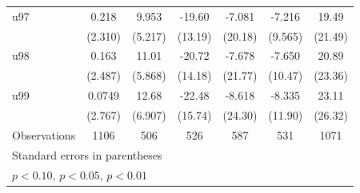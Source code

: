 \begin{table}[htbp]
\begin{tabular}{l*{6}{c}}
\addlinespace
u97                 &       0.218         &       9.953\sym{*}  &      -19.60         &      -7.081         &      -7.216         &       19.49         \\
                    &     (2.310)         &     (5.217)         &     (13.19)         &     (20.18)         &     (9.565)         &     (21.49)         \\
\addlinespace
u98                 &       0.163         &       11.01\sym{*}  &      -20.72         &      -7.678         &      -7.650         &       20.89         \\
                    &     (2.487)         &     (5.868)         &     (14.18)         &     (21.77)         &     (10.47)         &     (23.36)         \\
\addlinespace
u99                 &      0.0749         &       12.68\sym{*}  &      -22.48         &      -8.618         &      -8.335         &       23.11         \\
                    &     (2.767)         &     (6.907)         &     (15.74)         &     (24.30)         &     (11.90)         &     (26.32)         \\
\midrule
Observations        &        1106         &         506         &         526         &         587         &         531         &        1071         \\
\bottomrule
\multicolumn{7}{l}{\footnotesize Standard errors in parentheses}\\
\multicolumn{7}{l}{\footnotesize \sym{*} \(p<0.10\), \sym{**} \(p<0.05\), \sym{***} \(p<0.01\)}\\
\end{tabular}
\end{table}
